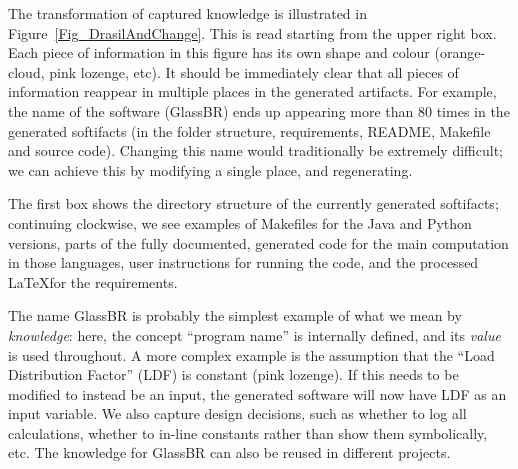 \documentclass[sigconf,review,anonymous=false]{acmart}
\begin{document}
The transformation of captured knowledge is illustrated in
Figure~\ref{Fig_DrasilAndChange}. This is read starting from the upper
right box. Each piece of information in this figure has its own
shape and colour (orange-cloud, pink lozenge, etc). It should be immediately clear
that all pieces of information reappear in multiple places in the generated
artifacts. For example, the name of the software (GlassBR) ends up
appearing more than 80 times in the generated softifacts (in the folder
structure, requirements, README, Makefile and source code). Changing this
name would traditionally be extremely difficult; we can achieve this by
modifying a single place, and regenerating.

The first box shows the directory structure of the currently generated
softifacts; continuing clockwise, we see examples of Makefiles for
the Java and Python versions, parts of the fully documented, 
generated code for the main computation in those languages, user
instructions for running the code, and the processed \LaTeX for the
requirements.

The name GlassBR is probably the simplest example of what we mean by
\emph{knowledge}: here, the concept ``program name'' is internally defined, and
its \emph{value} is used throughout. A more complex example is the assumption that the ``Load Distribution Factor'' (LDF) is constant
(pink lozenge). If this needs to be modified to instead be an input, the generated software
will now have LDF as an input variable.  We also capture design decisions,
such as whether to log all calculations, whether to in-line constants rather
than show them symbolically, etc. The knowledge for GlassBR can also be reused
in different projects.
\end{document}
